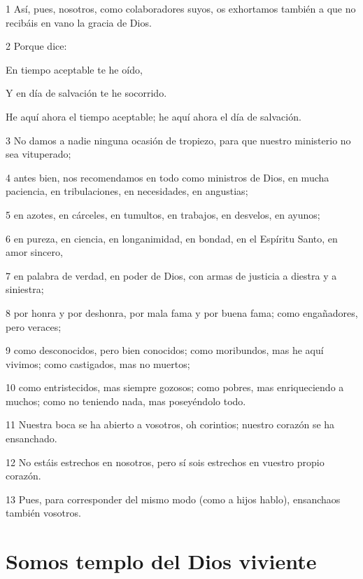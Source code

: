 \par 1 Así, pues, nosotros, como colaboradores suyos, os exhortamos también a que no recibáis en vano la gracia de Dios.
\par 2 Porque dice:
\par En tiempo aceptable te he oído,
\par Y en día de salvación te he socorrido.
\par He aquí ahora el tiempo aceptable; he aquí ahora el día de salvación.
\par 3 No damos a nadie ninguna ocasión de tropiezo, para que nuestro ministerio no sea vituperado;
\par 4 antes bien, nos recomendamos en todo como ministros de Dios, en mucha paciencia, en tribulaciones, en necesidades, en angustias;
\par 5 en azotes, en cárceles, en tumultos, en trabajos, en desvelos, en ayunos;
\par 6 en pureza, en ciencia, en longanimidad, en bondad, en el Espíritu Santo, en amor sincero,
\par 7 en palabra de verdad, en poder de Dios, con armas de justicia a diestra y a siniestra;
\par 8 por honra y por deshonra, por mala fama y por buena fama; como engañadores, pero veraces;
\par 9 como desconocidos, pero bien conocidos; como moribundos, mas he aquí vivimos; como castigados, mas no muertos;
\par 10 como entristecidos, mas siempre gozosos; como pobres, mas enriqueciendo a muchos; como no teniendo nada, mas poseyéndolo todo.
\par 11 Nuestra boca se ha abierto a vosotros, oh corintios; nuestro corazón se ha ensanchado.
\par 12 No estáis estrechos en nosotros, pero sí sois estrechos en vuestro propio corazón.
\par 13 Pues, para corresponder del mismo modo (como a hijos hablo), ensanchaos también vosotros.

\section*{Somos templo del Dios viviente}

